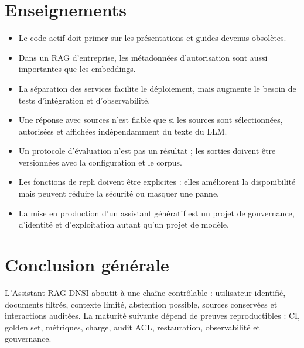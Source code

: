\section{Enseignements}
\begin{itemize}
\item Le code actif doit primer sur les présentations et guides devenus obsolètes.
\item Dans un RAG d’entreprise, les métadonnées d’autorisation sont aussi importantes que les embeddings.
\item La séparation des services facilite le déploiement, mais augmente le besoin de tests d’intégration et d’observabilité.
\item Une réponse avec sources n’est fiable que si les sources sont sélectionnées, autorisées et affichées indépendamment du texte du LLM.
\item Un protocole d’évaluation n’est pas un résultat ; les sorties doivent être versionnées avec la configuration et le corpus.
\item Les fonctions de repli doivent être explicites : elles améliorent la disponibilité mais peuvent réduire la sécurité ou masquer une panne.
\item La mise en production d’un assistant génératif est un projet de gouvernance, d’identité et d’exploitation autant qu’un projet de modèle.
\end{itemize}
\section{Conclusion générale}
L'Assistant RAG DNSI aboutit à une chaîne contrôlable : utilisateur identifié, documents filtrés, contexte limité, abstention possible, sources conservées et interactions auditées. La maturité suivante dépend de preuves reproductibles : CI, golden set, métriques, charge, audit ACL, restauration, observabilité et gouvernance.
